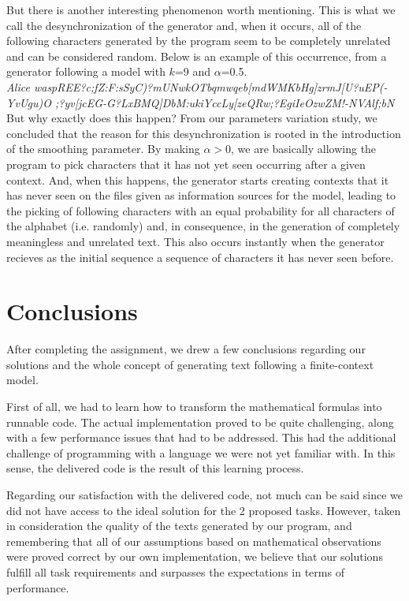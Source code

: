 \documentclass[12pt]{article}
\begin{document}
But there is another interesting phenomenon worth mentioning.
This is what we call the desynchronization of the generator and, when it occurs,
all of the following characters generated by the program seem to be completely
unrelated and can be considered random.
Below is an example of this occurrence, from a generator following a model
with \(k\)=9 and $\alpha$=0.5.\\

{\it Alice waspREE?c;fZ:F:sSyC)?mUNwkOTbqmwqeb[mdWMKbHg]zrmJ[U?uEP(-YvUgu)O ;?yv[jcEG-G?LxBMQ]DbM:ukiYccLy[zeQRw;?EgiIeOzwZM!-NVAlf;bN \/}
\\

But why exactly does this happen? 
From our parameters variation study, we concluded that the reason for this
desynchronization is rooted in the introduction of the smoothing parameter.
By making $\alpha$$>$0, we are basically allowing the program to pick characters
that it has not yet seen occurring after a given context.
And, when this happens, the generator starts creating contexts that it has
never seen on the files given as information sources for the model, leading
to the picking of following characters with an equal probability for all
characters of the alphabet (i.e. randomly) and, in consequence, in the 
generation of completely meaningless and unrelated text.
This also occurs instantly when the generator recieves as the initial sequence
a sequence of characters it has never seen before.

\newpage
\section*{Conclusions}

After completing the assignment, we drew a few conclusions regarding our 
solutions and the whole concept of generating text following a finite-context
model.

First of all, we had to learn how to transform the mathematical formulas into 
runnable code.
The actual implementation proved to be quite challenging, along with a few
performance issues that had to be addressed.
This had the additional challenge of programming with a language we were not 
yet familiar with.
In this sense, the delivered code is the result of this learning process.

Regarding our satisfaction with the delivered code, not much can be said since
we did not have access to the ideal solution for the 2 proposed tasks.
However, taken in consideration the quality of the texts generated by our 
program, and remembering that all of our assumptions based on mathematical
observations were proved correct by our own implementation, we believe that
our solutions fulfill all task requirements and surpasses the expectations in 
terms of performance.
\end{document}
